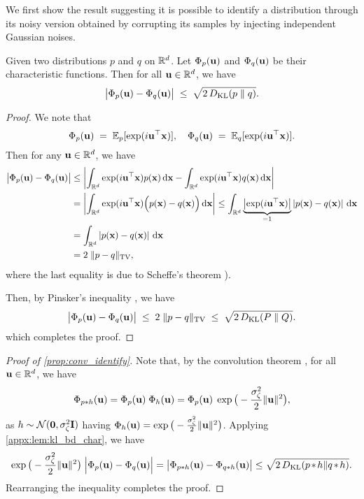 We first show the result suggesting it is possible to identify a distribution through its noisy version obtained by corrupting its samples by injecting independent Gaussian noises. 
\PROPCONVINDENTIFY*

\begin{lemma}
\label{appx:lem:kl_bd_char}
	Given two distributions $p$ and $q$ on $\mathbb{R}^d$. Let $\Phi_p(\mathbf{u})$ and $\Phi_q(\mathbf{u})$ be their characteristic functions. Then for all $\mathbf{u} \in \mathbb{R}^d$, we have
	\begin{align}
			\bigl|\Phi_p(\mathbf{u}) - \Phi_q(\mathbf{u})\bigr|
			\;\le\;
			\sqrt{2 \,D_{\mathrm{KL}}(p\;\|\;q)}.
	\end{align}
\end{lemma}


\begin{proof}
We note that 
\[
\Phi_p(\mathbf{u}) \;=\; \mathbb{E}_p[\exp(i\mathbf{u}^\top \mathbf{x})],
\quad
\Phi_q(\mathbf{u}) \;=\; \mathbb{E}_q[\exp(i\mathbf{u}^\top \mathbf{x})].
\]
Then for any $\mathbf{u} \in \mathbb{R}^d$, we have
\begin{align*}
\bigl|\Phi_p(\mathbf{u}) - \Phi_q(\mathbf{u})\bigr|
& \le
\left|\int_{\mathbb{R}^d} \exp(i\mathbf{u}^\top\mathbf{x}) p(\mathbf{x}) \,\mathrm{d} \mathbf{x} - \int_{\mathbb{R}^d} \exp(i\mathbf{u}^\top\mathbf{x}) q(\mathbf{x}) \,\mathrm{d} \mathbf{x} \right| \\
& = \left|\int_{\mathbb{R}^d} \exp(i\mathbf{u}^\top\mathbf{x}) \Big(p(\mathbf{x}) -  q(\mathbf{x}) \Big) \,\mathrm{d} \mathbf{x} \right|  \leq \int_{\mathbb{R}^d} \underbrace{\left|\exp(i\mathbf{u}^\top\mathbf{x})\right|}_{=1}  \left| p(\mathbf{x})  -  q(\mathbf{x}) \right| \,\mathrm{d} \mathbf{x} \\
& = \int_{\mathbb{R}^d}  \left| p(\mathbf{x})  -  q(\mathbf{x}) \right| \,\mathrm{d} \mathbf{x} \\
& = 2 \; \|p - q\|_{\mathrm{TV}},
\end{align*}
where the last equality is due to Scheffe's theorem \citep[Lemma 2.1, p. 84]{Tsybakov09}). 


Then, by Pinsker's inequality \citep[Lemma 2.5, p. 88]{Tsybakov09}, we have 
\[
\bigl|\Phi_p(\mathbf{u}) - \Phi_q(\mathbf{u})\bigr|
\;\le\;
2 \; \|p - q\|_{\mathrm{TV}}
\;\le\;
\sqrt{2\,D_{\mathrm{KL}}(P\;\|\;Q)}.
\]
which completes the proof. 
\end{proof}
\begin{proof}[Proof of \cref{prop:conv_identify}]
	Note that, by the convolution theorem \citep[A.4]{Meister2009},  for all $\mathbf{u} \in \mathbb{R}^d$, we have 
	\begin{align*}
		\Phi_{p * h}(\mathbf{u}) = \Phi_{p}(\mathbf{u}) \; \Phi_{h}(\mathbf{u}) = \Phi_{p}(\mathbf{u}) \; \exp \big(-\frac{\sigma_\zeta^2}{2} \|\mathbf{u}\|^2 \big),
	\end{align*}
	as $h\sim \mathcal{N}(\mathbf{0}, \sigma_\zeta^2\mathbf{I})$ having $\Phi_h(\mathbf{u}) = \exp \big(-\frac{\sigma_\zeta^2}{2} \|\mathbf{u}\|^2 \big)$. Applying \cref{appx:lem:kl_bd_char}, we have
	\begin{align}
		\exp \big(-\frac{\sigma_\zeta^2}{2}\|\mathbf{u}\|^2\big) \; \Big|\Phi_{p}(\mathbf{u}) - \Phi_{q}(\mathbf{u})\Big|  = \big|\Phi_{p * h}(\mathbf{u}) - \Phi_{q * h}(\mathbf{u}) \big| \leq \sqrt{2\,D_{\mathrm{KL}}(p \hspace{-0.1em}*\hspace{-0.1em} h\|q\hspace{-0.1em}*\hspace{-0.1em} h)}. 
	\end{align}	
	Rearranging the inequality completes the proof. 
\end{proof}


